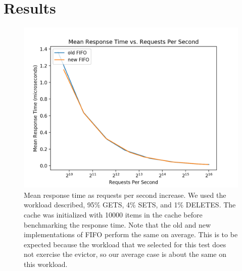 \documentclass[12pt]{article}
\begin{document}
\section{Results}
\bigskip 

\begin{figure}
\centering
\includegraphics[scale=0.75]{reqs_per_sec_newold.png}
\caption{Mean response time as requests per second increase. We used the workload described, 95\% GETS, 4\% SETS, and 1\% DELETES. The cache was initialized with 10000 items in the cache before benchmarking the response time. Note that the old and new implementations of FIFO perform the same on average. This is to be expected because the workload that we selected for this test does not exercise the evictor, so our average case is about the same on this workload.}
\end{figure}
\end{document}
